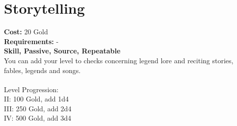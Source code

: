 \section*{Storytelling}
\textbf{Cost:} 20 Gold\\
\textbf{Requirements:} -\\
\textbf{Skill, Passive, Source, Repeatable}\\
You can add your level to checks concerning legend lore and reciting stories, fables, legends and songs.\\ 
\\
Level Progression:\\
II: 100 Gold, add 1d4\\
III: 250 Gold, add 2d4\\
IV: 500 Gold, add 3d4\\
